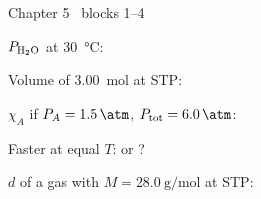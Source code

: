 \documentclass{apchem-worksheet}
\begin{document}
\begin{spiralstrip}{Chapter 5 \textbullet\ blocks 1--4}
  \item $P_{\ce{H2O}}$ at \SI{30}{\celsius}: 
  \item Volume of \SI{3.00}{\mole} at STP: 
  \item $\chi_A$ if $P_A = \SI{1.5}{\atm}$, $P_{\text{tot}} =
        \SI{6.0}{\atm}$: 
  \item Faster at equal $T$:  or ?
  \item $d$ of a gas with $M = \SI{28.0}{\gram\per\mole}$ at STP:
\end{spiralstrip}
\end{document}
